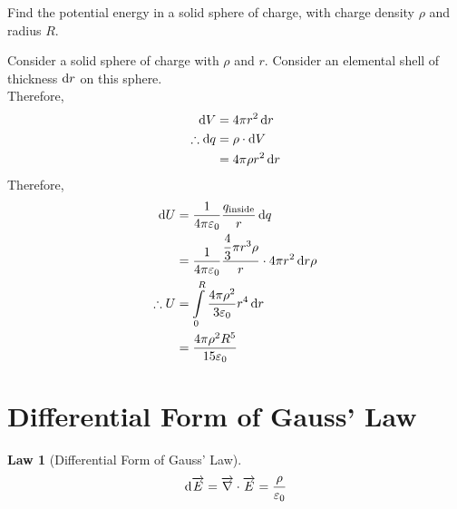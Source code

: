 \documentclass[fleqn, a4paper, 12pt, twoside]{article}
\theoremstyle{definition}
\theoremstyle{theorem}
\newtheorem{law}{Law}
\begin{document}
\begin{question}
	Find the potential energy in a solid sphere of charge, with charge density $\rho$ and radius $R$.
\end{question}

\begin{solution}
	Consider a solid sphere of charge with $\rho$ and $r$.
	Consider an elemental shell of thickness $\dif r$ on this sphere.\\
	Therefore,
	\begin{align*}
		\dif V &= 4 \pi r^2 \dif r\\
		\therefore \dif q &= \rho \cdot \dif V\\
		&= 4 \pi \rho r^2 \dif r
	\end{align*}
	Therefore,
	\begin{align*}
		\dif U &= \dfrac{1}{4 \pi \varepsilon_0} \dfrac{q_{\textnormal{inside}}}{r} \dif q\\
		&= \dfrac{1}{4 \pi \varepsilon_0} \dfrac{\dfrac{4}{3} \pi r^3 \rho}{r} \cdot 4 \pi r^2 \dif r \rho\\
		\therefore U &= \int\limits_{0}^{R} \dfrac{4 \pi \rho^2}{3 \varepsilon_0} r^4 \dif r\\
		&= \dfrac{4 \pi \rho^2 R^5}{15 \varepsilon_0}
	\end{align*}
\end{solution}

\section{Differential Form of Gauss' Law}

\begin{law}[Differential Form of Gauss' Law]
	\begin{equation*}
		\dif \overrightarrow{E} = \overrightarrow{\nabla} \cdot \overrightarrow{E} = \frac{\rho}{\varepsilon_0}
	\end{equation*}
\end{law}
\end{document}
